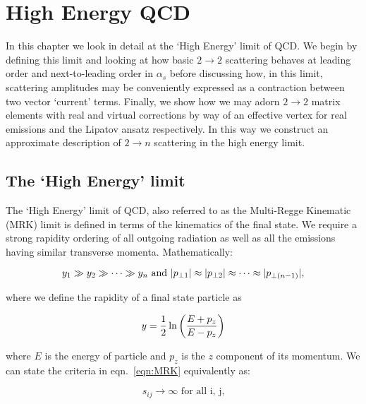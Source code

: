 
\chapter{High Energy QCD}
	\label{chap:HEQCD}

	In this chapter we look in detail at the `High Energy' limit of QCD.  We begin by defining this limit and
	looking at how basic $2\rightarrow2$ scattering behaves at leading order and next-to-leading order in
	$\alpha_s$ before discussing how, in this limit, scattering amplitudes may be conveniently expressed as
	a contraction between two vector `current' terms.  Finally, we show how we may adorn $2\to2$ matrix
	elements with real and virtual corrections by way of an effective vertex for real emissions and the Lipatov
	ansatz respectively.  In this way we construct an approximate description of $2\to n$ scattering in the high
	energy limit.

\section{The `High Energy' limit}
	\label{sub:HElimit}

	The `High Energy' limit of QCD, also referred to as the Multi-Regge Kinematic (MRK) limit is
	defined in terms of the kinematics of the final state.  We require a strong rapidity ordering
	of all outgoing radiation as well as all the emissions having similar transverse momenta.
	Mathematically:

	\begin{equation}
		y_1\gg y_2\gg\cdots\gg\\y_n \text{ and } |p_{\perp1}| \approx |p_{\perp2}| \approx\cdots\approx|p_{\perp(n-1)}|,
		\label{eqn:MRK}
	\end{equation}

		where we define the rapidity of a final state particle as

	\begin{equation}
		y = \frac{1}{2}\ln\left(\frac{E+p_z}{E-p_z}\right)
		\label{eqn:rap}
	\end{equation}

	where $E$ is the energy of particle and $p_z$ is the $z$ component of its momentum. We can
	state the criteria in eqn.~\eqref{eqn:MRK} equivalently as:

	\begin{equation}
		s_{ij}\rightarrow\infty\text{ for all i, j,}
	\end{equation}

